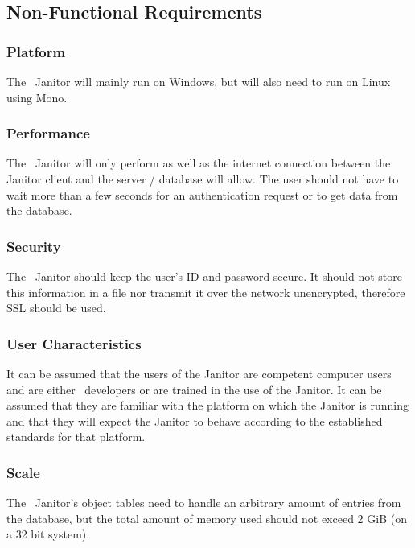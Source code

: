 \subsection{Non-Functional Requirements}

\subsubsection*{Platform}

The \VTank\ Janitor will mainly run on Windows, but will also need to run on Linux using Mono.

\subsubsection*{Performance}

The \VTank\ Janitor will only perform as well as the internet connection between the Janitor client and the server / database will allow.  The user should not have to wait more than a few seconds for an authentication request or to get data from the database.

\subsubsection*{Security}

The \VTank\ Janitor should keep the user's ID and password  secure. It should not store this information in a file nor transmit it over the network unencrypted, therefore SSL should be used. 

\subsubsection*{User Characteristics}

It can be assumed that the users of the Janitor are competent computer users and are either \VTank\ developers or are trained in the use of the Janitor. It can be assumed that they are familiar with the platform on which the Janitor is running and that they will expect the Janitor to behave according to the established standards for that platform. 

\subsubsection*{Scale}

The \VTank\ Janitor's object tables need to handle an arbitrary amount of entries from the database, but the total amount of memory used should not exceed 2 GiB (on a 32 bit system).

